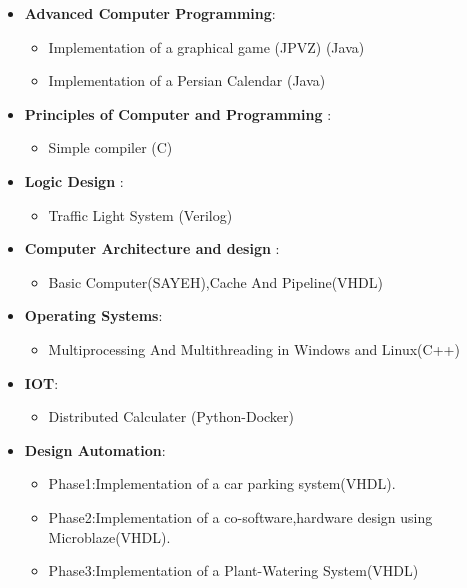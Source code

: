 \documentclass[letterpaper,MMMyyyy,nonstopmode]{simpleresumecv}
\begin{document}
\begin{Body}
\begin{itemize}
	\item \textbf{Advanced Computer Programming}:
		\begin{itemize}
		\item Implementation of a graphical game (JPVZ) (Java)
     	\item Implementation of a Persian Calendar (Java)
	    \end{itemize}
		
	\item \textbf{Principles of Computer and Programming }: 
		\begin{itemize}
	    \item  Simple compiler (C)
	      	\end{itemize}
   	\item \textbf{Logic Design} : 
   		\begin{itemize}
     \item  Traffic Light System (Verilog)
     		\end{itemize}
   	\item \textbf{Computer Architecture and design} :
   		\begin{itemize}
		\item Basic Computer(SAYEH),Cache And Pipeline(VHDL)
		\end{itemize}
		
    \item \textbf{Operating Systems}:
     \begin{itemize}
       \item Multiprocessing And Multithreading in Windows and Linux(C++)
		\end{itemize}
	
	\item \textbf{IOT}:
		\begin{itemize}
		\item Distributed Calculater (Python-Docker)
     	      
		\end{itemize}
	
	
	\item \textbf{Design Automation}:
		\begin{itemize}
		\item Phase1:Implementation of a car parking system(VHDL).
     	\item Phase2:Implementation of a co-software,hardware design using
     	      Microblaze(VHDL).
	    \item Phase3:Implementation of a Plant-Watering System(VHDL)
	          

\end{itemize}
\end{itemize}
\end{Body}
\end{document}
